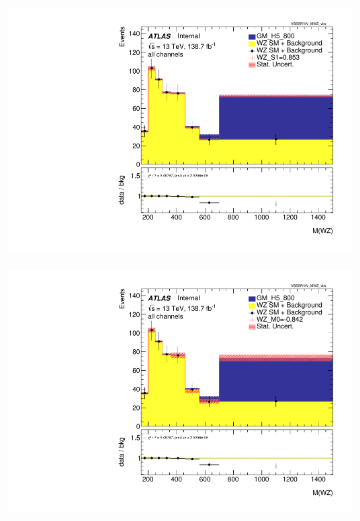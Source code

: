 \documentclass[../Bachelorarbeit.tex]{subfiles}
\begin{document}
\begin{figure}

    \centering
    \begin{subfigure}{0.3\textwidth}
        \includegraphics[width=\textwidth]{Plots/ALL_MWZ_final/GM_H5_800/S1/2022-04-21/VBSSR/all_VV_MWZ_vbs.pdf}
    \end{subfigure}
    \begin{subfigure}{0.3\textwidth}
        \includegraphics[width=\textwidth]{Plots/ALL_MWZ_final/GM_H5_800/M0/2022-04-21/VBSSR/all_VV_MWZ_vbs.pdf}
    \end{subfigure}
    \begin{subfigure}{0.3\textwidth}

\end{subfigure}
\end{figure}
\end{document}

